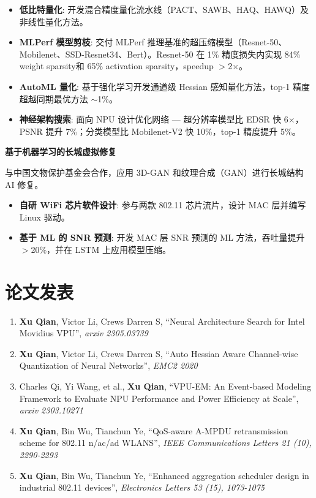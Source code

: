 \documentclass{resume_zh}
\begin{document}
\begin{itemize}
\item \textbf{低比特量化}: 开发混合精度量化流水线（PACT、SAWB、HAQ、HAWQ）及非线性量化方法。
\item \textbf{MLPerf 模型剪枝}: 交付 MLPerf 推理基准的超压缩模型（Resnet-50、Mobilenet、SSD-Resnet34、Bert）。Resnet-50 在 1\% 精度损失内实现 84\% weight sparsity和 65\% activation sparsity，speedup $>$2$\times$。
\item \textbf{AutoML 量化}: 基于强化学习开发通道级 Hessian 感知量化方法，top-1 精度超越同期最优方法 $\sim$1\%。
\item \textbf{神经架构搜索}: 面向 NPU 设计优化网络 --- 超分辨率模型比 EDSR 快 6$\times$，PSNR 提升 7\%；分类模型比 Mobilenet-V2 快 10\%，top-1 精度提升 5\%。
\end{itemize}

\textbf{基于机器学习的长城虚拟修复}

与中国文物保护基金会合作，应用 3D-GAN 和纹理合成（GAN）进行长城结构 AI 修复。

\begin{itemize}
  \item \textbf{自研 WiFi 芯片软件设计}: 参与两款 802.11 芯片流片，设计 MAC 层并编写 Linux 驱动。
  \item \textbf{基于 ML 的 SNR 预测}: 开发 MAC 层 SNR 预测的 ML 方法，吞吐量提升 $>$20\%，并在 LSTM 上应用模型压缩。
\end{itemize}

\section{论文发表}
\begin{enumerate}
  \item \textbf{Xu Qian}, Victor Li, Crews Darren S, ``Neural Architecture Search for Intel Movidius VPU'', \textit{arxiv 2305.03739}
  \item \textbf{Xu Qian}, Victor Li, Crews Darren S, ``Auto Hessian Aware Channel-wise Quantization of Neural Networks'', \textit{EMC2 2020}
  \item Charles Qi, Yi Wang, et al., \textbf{Xu Qian}, ``VPU-EM: An Event-based Modeling Framework to Evaluate NPU Performance and Power Efficiency at Scale'', \textit{arxiv 2303.10271}
  \item \textbf{Xu Qian}, Bin Wu, Tianchun Ye, ``QoS-aware A-MPDU retransmission scheme for 802.11 n/ac/ad WLANS'', \textit{IEEE Communications Letters 21 (10), 2290-2293}
  \item \textbf{Xu Qian}, Bin Wu, Tianchun Ye, ``Enhanced aggregation scheduler design in industrial 802.11 devices'', \textit{Electronics Letters 53 (15), 1073-1075}
\end{enumerate}
\end{document}
